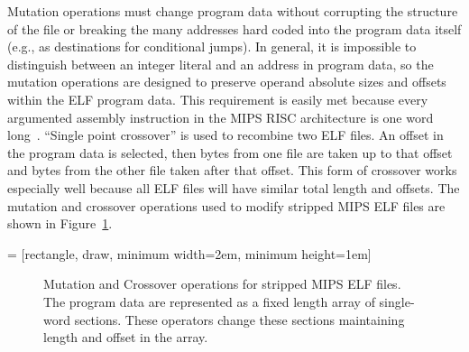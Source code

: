 \documentclass{sigcomm-alternate}
\begin{document}
Mutation operations must change program data without corrupting the
structure of the file or breaking the many addresses hard coded into
the program data itself (e.g., as destinations for conditional jumps).
In general, it is impossible to distinguish between an integer literal
and an address in program data, so the mutation operations are
designed to preserve operand absolute sizes and offsets within the ELF
program data.  This requirement is easily met because every argumented
assembly instruction in the MIPS RISC architecture is one word
long~\cite{hennessy1982mips}.  ``Single point crossover'' is used to
recombine two ELF files.  An offset in the program data is selected,
then bytes from one file are taken up to that offset and bytes from
the other file taken after that offset.  This form of crossover works
especially well because all ELF files will have similar total length and
offsets. The mutation and crossover operations used to modify stripped
MIPS ELF files are shown in Figure~\ref{mutation-ops}.

 = [rectangle, draw, minimum width=2em, minimum height=1em]
\begin{figure}[htb]
  \centering
{}
\caption{Mutation and Crossover operations for stripped MIPS ELF files.  The
  program data are represented as a fixed length array of single-word
  sections.  These operators change these sections maintaining length
  and offset in the array.}
  \label{mutation-ops}
\end{figure}
\end{document}
